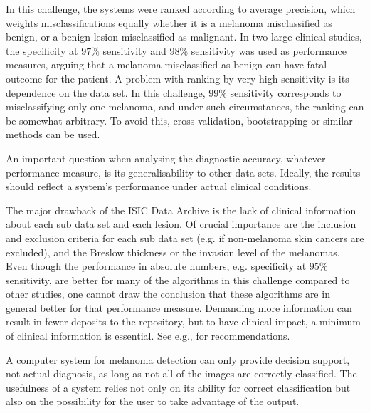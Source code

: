 \documentclass[a4paper,12pt]{article}
\begin{document}
In this challenge, the systems were ranked according to average precision, which weights misclassifications equally whether it is a melanoma misclassified as benign, or a benign lesion misclassified as malignant. 
In two large clinical studies, the specificity at $97\%$ sensitivity \citep{Malvehy2014Clinical} and $98\%$ sensitivity \citep{Monheit2011Performance} was used as performance measures, arguing that a melanoma misclassified as benign can have fatal outcome for the patient. 
A problem with ranking by very high sensitivity is its dependence on the data set. 
In this challenge, $99\%$ sensitivity corresponds to misclassifying only one melanoma, and under such circumstances, the ranking can be somewhat arbitrary. 
To avoid this, cross-validation, bootstrapping or similar methods can be used.   

An important question when analysing the diagnostic accuracy, whatever performance measure, is its generalisability to other data sets. 
Ideally, the results should reflect a system's performance under actual clinical conditions. 

The major drawback of the ISIC Data Archive is the lack of clinical information about each sub data set and each lesion. 
Of crucial importance are the inclusion and exclusion criteria for each sub data set (e.g. if non-melanoma skin cancers are excluded), and the Breslow thickness or the invasion level of the melanomas. 
Even though the performance in absolute numbers, e.g. specificity at $95\%$ sensitivity, are better for many of the algorithms in this challenge compared to other studies, one cannot draw the conclusion that these algorithms are in general better for that performance measure. 
Demanding more information can result in fewer deposits to the repository, but to have clinical impact, a minimum of clinical information is essential. 
See e.g., \citep{Malvehy2007Dermoscopy} for recommendations. 
 
A computer system for melanoma detection can only provide decision support, not actual diagnosis, as long as not all of the images are correctly classified. 
The usefulness of a system relies not only on its ability for correct classification but also on the possibility for the user to take advantage of the output. 

\end{document}
